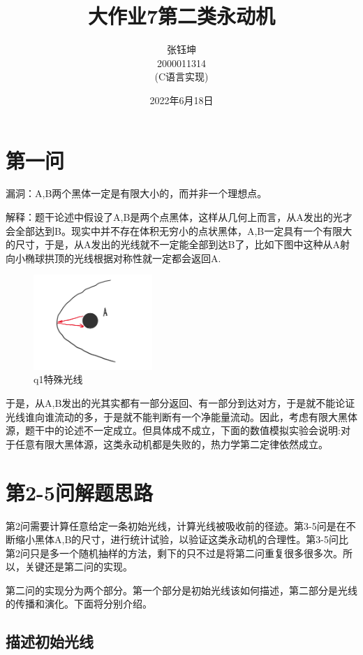 \documentclass[10pt, a4paper]{article}
\title{\heiti 大作业7\phantom{   }第二类永动机}
\author{ 张钰坤 \\  2000011314 \\(C语言实现)}
\date{2022年6月18日}
\begin{document}
    \maketitle
    \tableofcontents
    \newpage

    \section{第一问}
    漏洞：A,B两个黑体一定是有限大小的，而并非一个理想点。

    解释：题干论述中假设了A,B是两个点黑体，这样从几何上而言，从A发出的光才会全部达到B。现实中并不存在体积无穷小的点状黑体，A,B一定具有一个有限大的尺寸，于是，从A发出的光线就不一定能全部到达B了，比如下图中这种从A射向小椭球拱顶的光线根据对称性就一定都会返回A.

    \begin{figure}[H]
        \centering
        \includegraphics[width=0.4\textwidth]{q1特殊光线.png}
        \caption{q1特殊光线}\label{fig:q1特殊光线}
    \end{figure}

    于是，从A,B发出的光其实都有一部分返回、有一部分到达对方，于是就不能论证光线谁向谁流动的多，于是就不能判断有一个净能量流动。因此，考虑有限大黑体源，题干中的论述不一定成立。但具体成不成立，下面的数值模拟实验会说明:对于任意有限大黑体源，这类永动机都是失败的，热力学第二定律依然成立。

    \section{第2-5问解题思路}

    第2问需要计算任意给定一条初始光线，计算光线被吸收前的径迹。第3-5问是在不断缩小黑体A,B的尺寸，进行统计试验，以验证这类永动机的合理性。第3-5问比第2问只是多一个随机抽样的方法，剩下的只不过是将第二问重复很多很多次。所以，关键还是第二问的实现。
    
    第二问的实现分为两个部分。第一个部分是初始光线该如何描述，第二部分是光线的传播和演化。下面将分别介绍。

    \subsection{描述初始光线}
\end{document}
